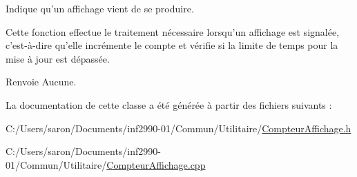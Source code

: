 Indique qu'un affichage vient de se produire. 

Cette fonction effectue le traitement nécessaire lorsqu'un affichage est signalée, c'est-\/à-\/dire qu'elle incrémente le compte et vérifie si la limite de temps pour la mise à jour est dépassée.

\begin{DoxyReturn}{Renvoie}
Aucune. 
\end{DoxyReturn}


La documentation de cette classe a été générée à partir des fichiers suivants \-:\begin{DoxyCompactItemize}
\item 
C\-:/\-Users/saron/\-Documents/inf2990-\/01/\-Commun/\-Utilitaire/\hyperlink{_compteur_affichage_8h}{Compteur\-Affichage.\-h}\item 
C\-:/\-Users/saron/\-Documents/inf2990-\/01/\-Commun/\-Utilitaire/\hyperlink{_compteur_affichage_8cpp}{Compteur\-Affichage.\-cpp}\end{DoxyCompactItemize}
